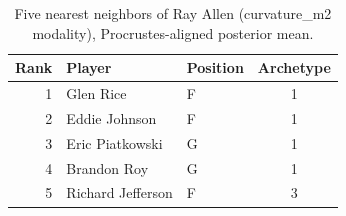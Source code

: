 \begin{table}[htbp]
  \centering\small
  \begin{tabular}{rllc}
    \toprule
    Rank & Player & Position & Archetype \\
    \midrule
    1 & Glen Rice & F & 1 \\
    2 & Eddie Johnson & F & 1 \\
    3 & Eric Piatkowski & G & 1 \\
    4 & Brandon Roy & G & 1 \\
    5 & Richard Jefferson & F & 3 \\
    \bottomrule
  \end{tabular}
  \caption{Five nearest neighbors of Ray Allen (curvature_m2 modality), Procrustes-aligned posterior mean.}
  \label{tab:Ray_Allen_neighbors_curvature_m2}
\end{table}

